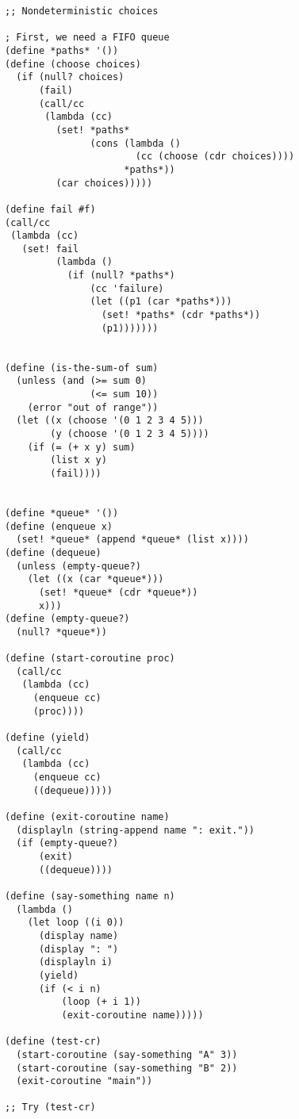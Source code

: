 \begin{lstlisting}
;; Nondeterministic choices

; First, we need a FIFO queue
(define *paths* '())
(define (choose choices)
  (if (null? choices)
      (fail)
      (call/cc
       (lambda (cc)
         (set! *paths*
               (cons (lambda ()
                       (cc (choose (cdr choices))))
                     *paths*))
         (car choices)))))

(define fail #f)
(call/cc
 (lambda (cc)
   (set! fail
         (lambda ()
           (if (null? *paths*)
               (cc 'failure)
               (let ((p1 (car *paths*)))
                 (set! *paths* (cdr *paths*))
                 (p1)))))))

              
(define (is-the-sum-of sum)
  (unless (and (>= sum 0)
               (<= sum 10))
    (error "out of range"))
  (let ((x (choose '(0 1 2 3 4 5)))
        (y (choose '(0 1 2 3 4 5))))
    (if (= (+ x y) sum)
        (list x y)
        (fail))))


(define *queue* '())
(define (enqueue x)
  (set! *queue* (append *queue* (list x))))
(define (dequeue)
  (unless (empty-queue?)
    (let ((x (car *queue*)))
      (set! *queue* (cdr *queue*))
      x)))
(define (empty-queue?)
  (null? *queue*))

(define (start-coroutine proc)
  (call/cc
   (lambda (cc)
     (enqueue cc)
     (proc))))

(define (yield)
  (call/cc
   (lambda (cc)
     (enqueue cc)
     ((dequeue)))))

(define (exit-coroutine name)
  (displayln (string-append name ": exit."))
  (if (empty-queue?)
      (exit)
      ((dequeue))))

(define (say-something name n)
  (lambda ()
    (let loop ((i 0))
      (display name)
      (display ": ")
      (displayln i)
      (yield)
      (if (< i n)
          (loop (+ i 1))
          (exit-coroutine name)))))

(define (test-cr)
  (start-coroutine (say-something "A" 3))
  (start-coroutine (say-something "B" 2))
  (exit-coroutine "main"))

;; Try (test-cr)

\end{lstlisting}